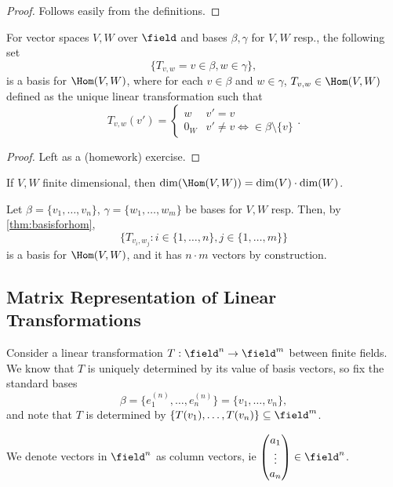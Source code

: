\begin{proof}
    Follows easily from the definitions.
\end{proof}

\begin{theorem}\label{thm:basisforhom}
    For vector spaces $V, W$ over $\field$ and bases $\beta, \gamma$ for $V, W$ resp., the following set \[
    \{T_{v, w} = v \in \beta, w \in \gamma\},
    \]
    is a basis for $\Hom(V, W)$, where for each $v \in \beta$ and $w \in \gamma$, $T_{v, w} \in \Hom(V, W)$ defined as the unique linear transformation such that $$T_{v, w} (v') = \begin{cases}
        w & v' = v\\
        0_W & v' \neq v \iff \in \beta \setminus \{v\}
    \end{cases}.$$
\end{theorem}

\begin{proof}
    Left as a (homework) exercise.
\end{proof}



\begin{corollary}
    If $V, W$ finite dimensional, then $\dim(\Hom(V, W)) = \dim(V) \cdot \dim(W)$.
\end{corollary}

\begin{proposition}
    Let $\beta = \{v_1, \dots, v_n\}$, $\gamma = \{w_1, \dots, w_m\}$ be bases for $V, W$ resp. Then, by \cref{thm:basisforhom}, \[
        \{T_{v_i, w_j} : i \in \{1, \dots, n\}, j \in \{1, \dots, m\}\}
    \]
    is a basis for $\Hom(V, W)$, and it has $n \cdot m$ vectors by construction.
\end{proposition}

\subsection{Matrix Representation of Linear Transformations}

Consider a linear transformation $T : \field^n \to \field^m$ between finite fields. We know that $T$ is uniquely determined by its value of basis vectors, so fix the standard bases \[
\beta = \{e_1^{(n)}, \dots, e_n^{(n)}\}=\{v_1, \dots, v_n\},
\]
and note that $T$ is determined by $\{T(v_1), \dots, T(v_n)\} \subseteq \field^m$. 

\begin{remark}
    We denote vectors in $\field^n$ as column vectors, ie $\begin{pmatrix}
        a_1\\
        \vdots\\
        a_n
    \end{pmatrix} \in \field^n$.
\end{remark}

